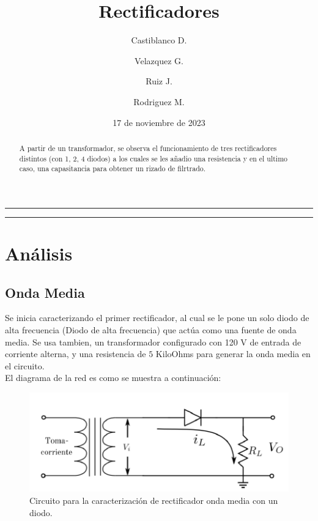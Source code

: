 \documentclass[10pt,letterpaper]{article}
\author[1]{Castiblanco D.}
\author[2]{Velazquez G.}
\author[3]{Ruiz J.}
\author[4]{Rodriguez M.}
\affil[1, 2, 3, 4]{Departmento de física\\
Universidad Nacional de Colombia - Bogotá}
\title{ \Huge Rectificadores}
\date{17 de noviembre de 2023}
\begin{document}
\maketitle

\begin{center}\rule{\textwidth}{0.1mm}\end{center}
\begin{center}\vspace{0.2cm}

	\begin{abstract}
		A partir de un transformador, se observa el funcionamiento de tres rectificadores distintos (con 1, 2, 4 diodos) a los cuales se les añadio una resistencia y en el ultimo caso, una capasitancia para obtener un rizado de filrtrado.

	\end{abstract}

\end{center}


\begin{center}\rule{\textwidth}{0.1mm}\end{center}

\section{Análisis}

\subsection{Onda Media}

Se inicia caracterizando el primer rectificador, al cual se le pone un solo diodo de alta frecuencia (Diodo de alta frecuencia) que actúa como una fuente de onda media.
Se usa tambien, un transformador configurado con 120 V de entrada de corriente alterna,
y una resistencia de $5$ KiloOhms para generar la onda media en el circuito.
\\ El diagrama de la red es como se muestra a continuación:

\begin{figure}[H]
	\centering
	\includegraphics[scale=1.5]{OndaMedia.png}
	\caption{Circuito para la caracterización de rectificador onda media con un diodo.}
	\label{salida}
\end{figure}
\end{document}
